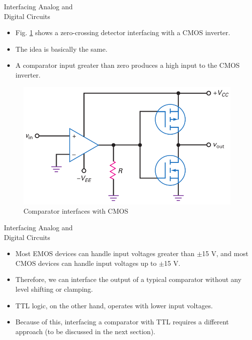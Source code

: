 \documentclass[pdflatex,compress]{beamer}
\begin{document}
\begin{frame}{Interfacing Analog and\\Digital Circuits}
	\begin{multicols}{2}
		\begin{itemize}
			\item Fig. \ref{fig:205b} shows a zero-crossing detector interfacing with a CMOS inverter.
			\item The idea is basically the same.
			\item A comparator input greater than zero produces a high input to the CMOS inverter.
		\end{itemize}
		\begin{figure}
			\centering
			\includegraphics[width=\linewidth]{img/205b}
			\caption{Comparator interfaces with CMOS}
			\label{fig:205b}
		\end{figure}
	\end{multicols}
\end{frame}

\begin{frame}{Interfacing Analog and\\Digital Circuits}
	\begin{itemize}
		\item Most EMOS devices can handle input voltages greater than $\pm$15 V, and most CMOS devices can handle input voltages up to $\pm$15 V.
		\item Therefore, we can interface the output of a typical comparator without any level shifting or clamping.
		\item TTL logic, on the other hand, operates with lower input voltages.
		\item Because of this, interfacing a comparator with TTL requires a different approach (to be discussed in the next section).
	\end{itemize}
\end{frame}
\end{document}
